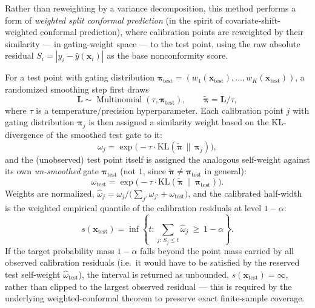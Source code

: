\documentclass[11pt]{article}
\begin{document}
Rather than reweighting by a variance decomposition, this method performs a form of \emph{weighted
split conformal prediction} (in the spirit of covariate-shift-weighted conformal prediction), where
calibration points are reweighted by their similarity — in gating-weight space — to the test point,
using the raw absolute residual $S_i = |y_i - \hat{y}(\bm{x}_i)|$ as the base nonconformity score.

For a test point with gating distribution $\bm{\pi}_{\mathrm{test}} = (w_1(\bm{x}_{\mathrm{test}}),
\dots, w_K(\bm{x}_{\mathrm{test}}))$, a randomized smoothing step first draws
\begin{equation}
\bm{L} \sim \operatorname{Multinomial}(\tau, \bm{\pi}_{\mathrm{test}}), \qquad \tilde{\bm{\pi}} =
\bm{L}/\tau,
\end{equation}
where $\tau$ is a temperature/precision hyperparameter. Each calibration point $j$ with gating
distribution $\bm{\pi}_j$ is then assigned a similarity weight based on the KL-divergence of the
smoothed test gate to it:
\begin{equation}
\omega_j = \exp\!\big(-\tau \cdot \mathrm{KL}(\tilde{\bm{\pi}} \,\|\, \bm{\pi}_j)\big),
\end{equation}
and the (unobserved) test point itself is assigned the analogous self-weight against its own
\emph{un-smoothed} gate $\bm{\pi}_{\mathrm{test}}$ (not $1$, since $\tilde{\bm{\pi}} \neq
\bm{\pi}_{\mathrm{test}}$ in general):
\begin{equation}
\label{eq:moecp-selfweight}
\omega_{\mathrm{test}} = \exp\!\big(-\tau \cdot \mathrm{KL}(\tilde{\bm{\pi}} \,\|\,
\bm{\pi}_{\mathrm{test}})\big).
\end{equation}
Weights are normalized, $\hat{\omega}_j = \omega_j / \big(\sum_{j'} \omega_{j'} +
\omega_{\mathrm{test}}\big)$, and the calibrated half-width is the weighted empirical quantile of
the calibration residuals at level $1-\alpha$:
\begin{equation}
s(\bm{x}_{\mathrm{test}}) = \inf\left\{ t : \sum_{j:\, S_j \le t} \hat{\omega}_j \ \ge\ 1-\alpha
\right\}.
\end{equation}
If the target probability mass $1-\alpha$ falls beyond the point mass carried by all observed
calibration residuals (i.e.\ it would have to be satisfied by the reserved test self-weight
$\hat{\omega}_{\mathrm{test}}$), the interval is returned as unbounded, $s(\bm{x}_{\mathrm{test}})
= \infty$, rather than clipped to the largest observed residual — this is required by the
underlying weighted-conformal theorem to preserve exact finite-sample coverage.
\end{document}
